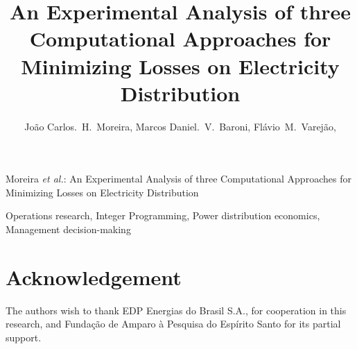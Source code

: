\documentclass{IEEEtran}
\begin{document}
\title{An Experimental Analysis of three Computational Approaches for Minimizing Losses on Electricity Distribution}

\author{Jo\~ao Carlos.~H.~Moreira,
	Marcos Daniel.~V.~Baroni,
	Fl\'avio~M.~Varej\~ao,
}

%
{Moreira \MakeLowercase{\textit{et al.}}: An Experimental Analysis of three Computational Approaches for Minimizing Losses on Electricity Distribution}

\maketitle

\begin{abstract}

\end{abstract}

\begin{IEEEkeywords}
Operations research, Integer Programming, Power distribution economics, Management decision-making
\end{IEEEkeywords}

\IEEEpeerreviewmaketitle









\section*{Acknowledgement}
The authors wish to thank EDP Energias do Brasil S.A., for cooperation in this research, and
Funda\c c\~ao de Amparo \`a Pesquisa do Esp\'irito Santo for its partial support.

\ifCLASSOPTIONcaptionsoff
  \newpage
\fi





\flushend
\end{document}
